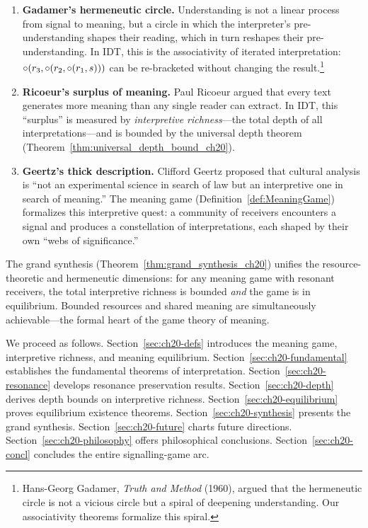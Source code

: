 \begin{enumerate}
  \item \textbf{Gadamer's hermeneutic circle.}  Understanding is not a
    linear process from signal to meaning, but a circle in which the
    interpreter's pre-understanding shapes their reading, which in turn
    reshapes their pre-understanding.  In IDT, this is the associativity of
    iterated interpretation: $\circ(r_3, \circ(r_2, \circ(r_1, s)))$
    can be re-bracketed without changing the result.\footnote{Hans-Georg
    Gadamer, \textit{Truth and Method} (1960), argued that the hermeneutic
    circle is not a vicious circle but a spiral of deepening understanding.
    Our associativity theorems formalize this spiral.}

  \item \textbf{Ricoeur's surplus of meaning.}  Paul Ricoeur argued that
    every text generates more meaning than any single reader can extract.
    In IDT, this ``surplus'' is measured by \emph{interpretive richness}---the
    total depth of all interpretations---and is bounded by the universal
    depth theorem (Theorem~\ref{thm:universal_depth_bound_ch20}).

  \item \textbf{Geertz's thick description.}  Clifford Geertz proposed that
    cultural analysis is ``not an experimental science in search of law but
    an interpretive one in search of meaning.''  The meaning game
    (Definition~\ref{def:MeaningGame}) formalizes this interpretive quest:
    a community of receivers encounters a signal and produces a constellation
    of interpretations, each shaped by their own ``webs of significance.''
\end{enumerate}

The grand synthesis (Theorem~\ref{thm:grand_synthesis_ch20}) unifies the
resource-theoretic and hermeneutic dimensions: for any meaning game with
resonant receivers, the total interpretive richness is bounded \emph{and}
the game is in equilibrium.  Bounded resources and shared meaning are
simultaneously achievable---the formal heart of the game theory of meaning.

We proceed as follows.  Section~\ref{sec:ch20-defs} introduces the meaning
game, interpretive richness, and meaning equilibrium.
Section~\ref{sec:ch20-fundamental} establishes the fundamental theorems of
interpretation.  Section~\ref{sec:ch20-resonance} develops resonance
preservation results.  Section~\ref{sec:ch20-depth} derives depth bounds on
interpretive richness.  Section~\ref{sec:ch20-equilibrium} proves
equilibrium existence theorems.  Section~\ref{sec:ch20-synthesis} presents
the grand synthesis.  Section~\ref{sec:ch20-future} charts future
directions.  Section~\ref{sec:ch20-philosophy} offers philosophical
conclusions.  Section~\ref{sec:ch20-concl} concludes the entire
signalling-game arc.

